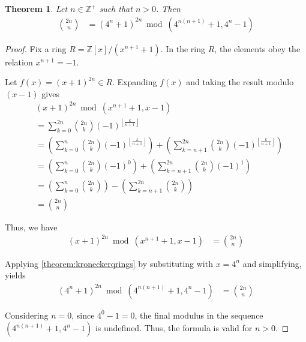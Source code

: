 \documentclass[12pt,reqno]{article}
\theoremstyle{plain}
\newtheorem{theorem}{Theorem}
\theoremstyle{definition}
\newcommand{\floor}[1]{\left\lfloor #1 \right\rfloor}
\begin{document}
\begin{theorem}
Let $n \in \mathbb{Z}^+$ such that $n > 0$. Then
\begin{align*}
\binom{2n}{n} &= (4^n + 1)^{2n} \bmod{(4^{n(n+1)} + 1, 4^n - 1)}
\end{align*}
\end{theorem}
\begin{proof}
Fix a ring $R = \mathbb{Z}[x]/(x^{n+1} + 1)$. In the ring $R$, the elements obey the relation $x^{n+1} = -1$.

Let $f(x) = (x + 1)^{2n} \in R$. Expanding $f(x)$ and taking the result modulo $(x-1)$ gives
\begin{align*}
& (x + 1)^{2n} \bmod{(x^{n+1} + 1, x - 1)} \\
&= \sum_{k=0}^{2n} \binom{2n}{k} (-1)^{\floor{\frac{k}{n+1}}} \\
&= \left( \sum_{k=0}^{n} \binom{2n}{k} (-1)^{\floor{\frac{k}{n+1}}} \right) + \left( \sum_{k=n+1}^{2n} \binom{2n}{k} (-1)^{\floor{\frac{k}{n+1}}} \right) \\
&= \left( \sum_{k=0}^{n} \binom{2n}{k} (-1)^0 \right) + \left( \sum_{k=n+1}^{2n} \binom{2n}{k} (-1)^1 \right) \\
&= \left( \sum_{k=0}^{n} \binom{2n}{k} \right) - \left( \sum_{k=n+1}^{2n} \binom{2n}{k} \right) \\
&= \binom{2n}{n}
\end{align*}

Thus, we have
\begin{align*}
    (x + 1)^{2n} \bmod{(x^{n+1} + 1, x - 1)} &= \binom{2n}{n}
\end{align*}

Applying \cref{theorem:kroneckerqrings} by substituting with $x = 4^n$ and simplifying, yields
\begin{align*}
    (4^n + 1)^{2n} \bmod{(4^{n(n+1)} + 1, 4^n-1)} &= \binom{2n}{n}
\end{align*}

Considering $n = 0$, since $4^0-1 = 0$, the final modulus in the sequence $(4^{n(n+1)} + 1, 4^n-1)$ is undefined. Thus, the formula is valid for $n > 0$.
\end{proof}

\begingroup
\raggedright


\endgroup
\end{document}
